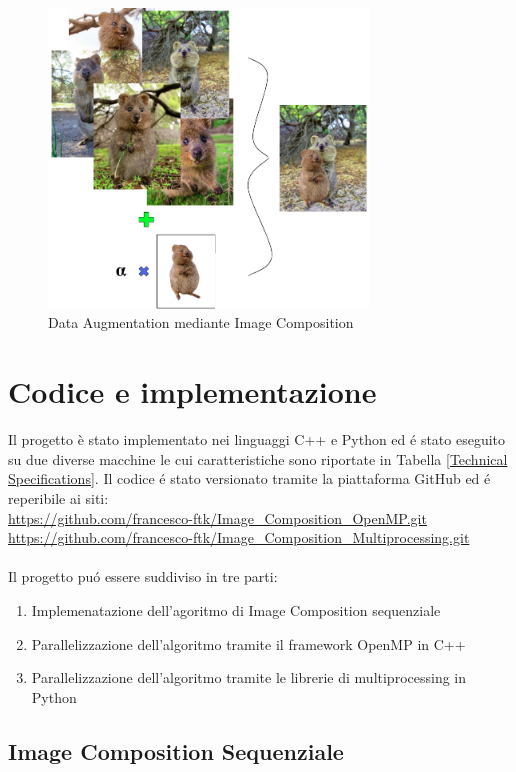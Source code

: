\documentclass{article}
\begin{document}
\begin{figure}[!h]
\centering
\includegraphics[width= 8.5cm]{"Immagini/Images.PNG"}
\caption{Data Augmentation mediante Image Composition}
\label{Images}
\end{figure}

\newpage

\section{Codice e implementazione}

Il progetto è stato implementato nei linguaggi C++ e Python ed \'e stato eseguito su due diverse macchine le cui caratteristiche sono riportate in Tabella \ref{Technical Specifications}. Il codice \'e stato versionato tramite la piattaforma GitHub ed \'e reperibile ai siti:\\
\url{https://github.com/francesco-ftk/Image_Composition_OpenMP.git} \\
\url{https://github.com/francesco-ftk/Image_Composition_Multiprocessing.git}\\
\\
\noindent Il progetto pu\'o essere suddiviso in tre parti:
\begin{enumerate}
\item Implemenatazione dell'agoritmo di Image Composition sequenziale
\item Parallelizzazione dell'algoritmo tramite il framework OpenMP in C++
\item Parallelizzazione dell'algoritmo tramite le librerie di multiprocessing in Python
\end{enumerate}

\subsection{Image Composition Sequenziale}
\end{document}
